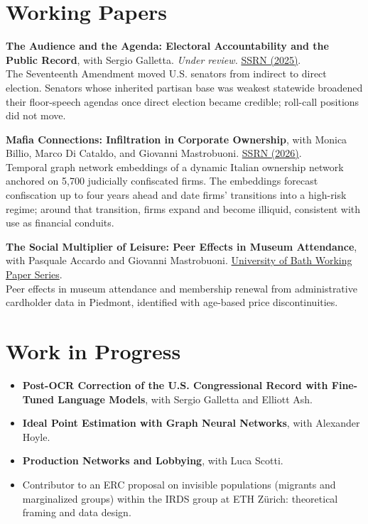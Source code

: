 \documentclass[11pt,a4paper]{article}
\newenvironment{papers}{\begin{enumerate}[leftmargin=1.6em,itemsep=4pt,parsep=0pt,topsep=2pt,label={[\arabic*]}]}{\end{enumerate}}
\begin{document}
\section{Working Papers}
\begin{papers}
\item \textbf{The Audience and the Agenda: Electoral Accountability and the Public Record}, with Sergio Galletta. \emph{Under review.} \href{https://papers.ssrn.com/sol3/papers.cfm?abstract_id=5110510}{SSRN (2025)}.\\
The Seventeenth Amendment moved U.S. senators from indirect to direct election. Senators whose inherited partisan base was weakest statewide broadened their floor-speech agendas once direct election became credible; roll-call positions did not move.
\item \textbf{Mafia Connections: Infiltration in Corporate Ownership}, with Monica Billio, Marco Di Cataldo, and Giovanni Mastrobuoni. \href{https://papers.ssrn.com/sol3/papers.cfm?abstract_id=7498463}{SSRN (2026)}.\\
Temporal graph network embeddings of a dynamic Italian ownership network anchored on 5,700 judicially confiscated firms. The embeddings forecast confiscation up to four years ahead and date firms' transitions into a high-risk regime; around that transition, firms expand and become illiquid, consistent with use as financial conduits.
\item \textbf{The Social Multiplier of Leisure: Peer Effects in Museum Attendance}, with Pasquale Accardo and Giovanni Mastrobuoni. \href{https://researchportal.bath.ac.uk/en/publications/the-social-multiplier-of-leisure-peer-effects-in-museum-attendanc}{University of Bath Working Paper Series}.\\
Peer effects in museum attendance and membership renewal from administrative cardholder data in Piedmont, identified with age-based price discontinuities.
\end{papers}

\section{Work in Progress}
\begin{itemize}
\item \textbf{Post-OCR Correction of the U.S. Congressional Record with Fine-Tuned Language Models}, with Sergio Galletta and Elliott Ash.
\item \textbf{Ideal Point Estimation with Graph Neural Networks}, with Alexander Hoyle.   %
\item \textbf{Production Networks and Lobbying}, with Luca Scotti.
\item Contributor to an ERC proposal on invisible populations (migrants and marginalized groups) within the IRDS group at ETH Z\"urich: theoretical framing and data design.
\end{itemize}
\end{document}
